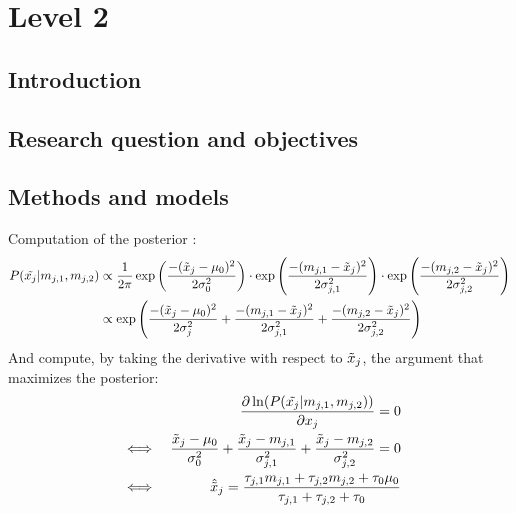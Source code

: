 \documentclass{article}
\begin{document}
\section*{Level 2}
\subsection*{Introduction}

\subsection*{Research question and objectives}
\subsection*{Methods and models}
Computation of the posterior :\\
\begin{align*}
P(\Tilde{x_j} | m_{j,1}, m_{j,2}) &\propto \frac{1}{2 \pi} \exp\left( \frac{-(\Tilde{x}_j-\mu_0)^2}{2 \sigma^2_0} \right) \cdot \exp\left( \frac{-(m_{j,1}-\Tilde{x}_j)^2}{2 \sigma_{j,1}^2} \right)\cdot \exp\left( \frac{-(m_{j,2}-\Tilde{x}_j)^2}{2 \sigma_{j,2}^2} \right) \\
&\propto \exp\left( \frac{-(\Tilde{x}_j-\mu_0)^2}{2 \sigma^2_j} + \frac{-(m_{j,1}-\Tilde{x}_j)^2}{2 \sigma_{j,1}^2} + \frac{-(m_{j,2}-\Tilde{x}_j)^2}{2 \sigma_{j,2}^2} \right) \\
\end{align*}
And compute, by taking the derivative with respect to $\Tilde{x}_j$, the argument that maximizes the posterior:\\
\begin{align*}
    &&\frac{\partial \ln(P(\Tilde{x_j} | m_{j,1}, m_{j,2}) )}{\partial x_j} = 0 \\
    &\iff &\frac{\Tilde{x}_j-\mu_0}{\sigma^2_0} + \frac{\Tilde{x}_j - m_{j,1}}{\sigma_{j,1}^2}+ \frac{\Tilde{x}_j - m_{j,2}}{\sigma_{j,2}^2} = 0 \\
    &\iff &\hat{\Tilde{x}}_j = \frac{\tau_{j,1}m_{j,1}+\tau_{j,2}m_{j,2}+\tau_0\mu_0}{\tau_{j,1}+\tau_{j,2}+\tau_0}
\end{align*}
\end{document}
